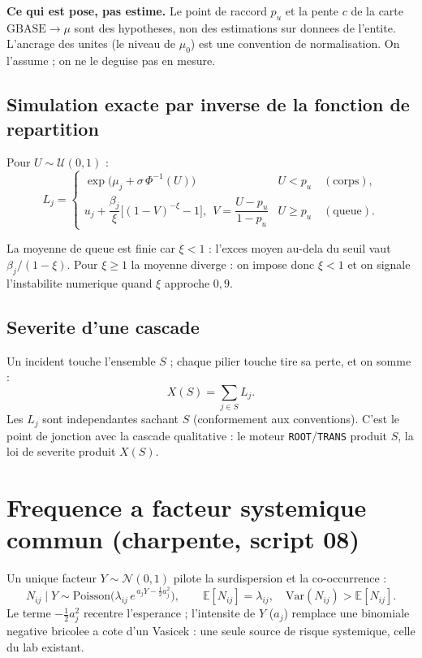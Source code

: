 \documentclass[11pt,a4paper]{article}
\newcommand{\E}{\mathbb{E}}
\newcommand{\Var}{\mathrm{Var}}
\begin{document}
\begin{attention}
\textbf{Ce qui est pose, pas estime.} Le point de raccord $p_u$ et la pente $c$ de la
carte $\mathrm{GBASE}\!\to\!\mu$ sont des hypotheses, non des estimations sur donnees
de l'entite. L'ancrage des unites (le niveau de $\mu_0$) est une convention de
normalisation. On l'assume ; on ne le deguise pas en mesure.
\end{attention}

\subsection{Simulation exacte par inverse de la fonction de repartition}

Pour $U\sim\mathcal U(0,1)$ :
\begin{equation}
L_j=
\begin{cases}
\exp\!\big(\mu_j+\sigma\,\Phi^{-1}(U)\big) & U<p_u \quad(\text{corps}),\\[4pt]
u_j+\dfrac{\beta_j}{\xi}\Big[(1-V)^{-\xi}-1\Big],\ \ V=\dfrac{U-p_u}{1-p_u} & U\ge p_u \quad(\text{queue}).
\end{cases}
\end{equation}

La moyenne de queue est finie car $\xi<1$ : l'exces moyen au-dela du seuil vaut
$\beta_j/(1-\xi)$. Pour $\xi\ge 1$ la moyenne diverge : on impose donc $\xi<1$ et on
signale l'instabilite numerique quand $\xi$ approche $0{,}9$.

\subsection{Severite d'une cascade}

Un incident touche l'ensemble $S$ ; chaque pilier touche tire sa perte, et on somme :
\begin{equation}
X(S)=\sum_{j\in S} L_j .
\end{equation}
Les $L_j$ sont independantes sachant $S$ (conformement aux conventions). C'est le
point de jonction avec la cascade qualitative : le moteur \texttt{ROOT}/\texttt{TRANS}
produit $S$, la loi de severite produit $X(S)$.

\section{Frequence a facteur systemique commun (charpente, script 08)}

Un unique facteur $Y\sim\mathcal N(0,1)$ pilote la surdispersion et la co-occurrence :
\begin{equation}
N_{ij}\mid Y \sim \mathrm{Poisson}\!\big(\lambda_{ij}\,e^{\,a_j Y-\tfrac12 a_j^2}\big),
\qquad \E[N_{ij}]=\lambda_{ij},\quad \Var(N_{ij})>\E[N_{ij}].
\end{equation}
Le terme $-\tfrac12 a_j^2$ recentre l'esperance ; l'intensite de $Y$ ($a_j$)
remplace une binomiale negative bricolee a cote d'un Vasicek : une seule source de
risque systemique, celle du lab existant.
\end{document}
